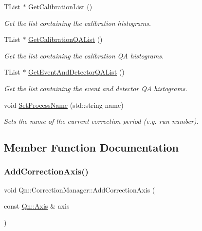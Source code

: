 \begin{DoxyCompactItemize}
T\+List $\ast$ \mbox{\hyperlink{classQn_1_1CorrectionManager_a923dd141e464cefb213bc7983db7ee3f}{Get\+Calibration\+List}} ()
\begin{DoxyCompactList}\small\item\em Get the list containing the calibration histograms. \end{DoxyCompactList}\item 
T\+List $\ast$ \mbox{\hyperlink{classQn_1_1CorrectionManager_a3823cab9639fe52cfcb5195284ca4bc9}{Get\+Calibration\+Q\+A\+List}} ()
\begin{DoxyCompactList}\small\item\em Get the list containing the calibration QA histograms. \end{DoxyCompactList}\item 
T\+List $\ast$ \mbox{\hyperlink{classQn_1_1CorrectionManager_a2a1f13026f434d2280bee0f191172a09}{Get\+Event\+And\+Detector\+Q\+A\+List}} ()
\begin{DoxyCompactList}\small\item\em Get the list containing the event and detector QA histograms. \end{DoxyCompactList}\item 
void \mbox{\hyperlink{classQn_1_1CorrectionManager_a7f23710ef8fc0babde47c95a0286e883}{Set\+Process\+Name}} (std\+::string name)
\begin{DoxyCompactList}\small\item\em Sets the name of the current correction period (e.\+g. run number). \end{DoxyCompactList}\end{DoxyCompactItemize}


\subsection{Member Function Documentation}
\mbox{\label{classQn_1_1CorrectionManager_a70e2e9393902f02ca5d218425f5f6201}} 
\subsubsection{\texorpdfstring{Add\+Correction\+Axis()}{AddCorrectionAxis()}}
{\footnotesize\ttfamily void Qn\+::\+Correction\+Manager\+::\+Add\+Correction\+Axis (\begin{DoxyParamCaption}\item[{const \mbox{\hyperlink{classQn_1_1Axis}{Qn\+::\+Axis}} \&}]{axis }\end{DoxyParamCaption})\hspace{0.3cm}{\ttfamily [inline]}}

